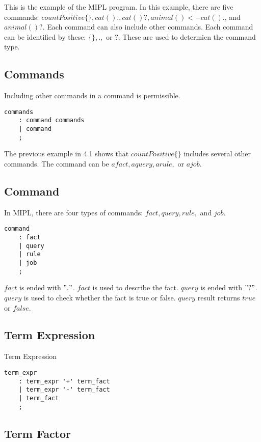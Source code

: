 \documentclass[prodmode,acmtecs]{acmsmall}
\begin{document}
This is the example of the MIPL program. In this example, there are five commands: $countPositive\{\}, cat()., cat()?, animal() <- cat().$, and $animal()?$. Each command can also include other commands. Each command can be identified by these: $\{\}, .,$ or $?$. These are used to determien the command type.

\subsection{Commands}

Including other commands in a command is permissible.

\begin{lstlisting}
commands
	: command commands
	| command
	;
\end{lstlisting}

The previous example in 4.1 shows that $countPositive\{\}$ includes several other commands. The command can be $a fact, a query, a rule,$ or $a job$.

\subsection{Command}

In MIPL, there are four types of commands: $fact, query, rule,$ and $job$.  

\begin{lstlisting}
command
	: fact
	| query
	| rule
	| job
	;
\end{lstlisting}

$fact$ is ended with $"."$. $fact$ is used to describe the fact. $query$ is ended with $"?"$. $query$ is used to check whether the fact is true or false. $query$ result returns $true$ or $false$. 


\subsection{Term Expression}

Term Expression
\begin{lstlisting}
term_expr
	: term_expr '+' term_fact
	| term_expr '-' term_fact
	| term_fact
	;
\end{lstlisting}

\subsection{Term Factor}
\end{document}
